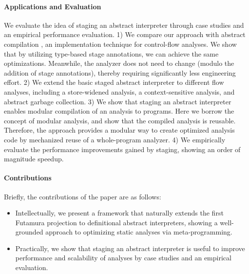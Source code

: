 \paragraph{Applications and Evaluation}
We evaluate the idea of staging an abstract interpreter through
case studies and an empirical performance evaluation.
1) We compare our approach with abstract compilation
\cite{Boucher:1996:ACN:647473.727587}, an implementation technique for
control-flow analyses. We show that by utilizing type-based stage
annotations, we can achieve the same optimizations. Meanwhile,
the analyzer does not need to change (modulo the addition of stage annotations),
thereby requiring significantly less engineering effort.
2) We extend the basic staged abstract interpreter to different flow
analyses, including a store-widened analysis, a context-sensitive
analysis, and abstract garbage collection.
3) We show that staging an abstract interpreter enables modular
compilation of an analysis to programs. Here we borrow the concept of
modular analysis, and show that the compiled analysis is reusable.
Therefore, the approach provides a modular way to create optimized
analysis code by mechanized reuse of a whole-program analyzer.
4) We empirically evaluate the performance improvements gained by staging,
showing an order of magnitude speedup.

\paragraph{Contributions} Briefly, the contributions of the paper are as follows:
\begin{itemize}[leftmargin=2em]
  \item Intellectually, we present a framework that naturally extends the first
    Futamura projection to definitional abstract interpreters, showing a
    well-grounded approach to optimizing static analyses via meta-programming.
  \item Practically, we show that staging an abstract interpreter is useful to
    improve performance and scalability of analyses by case studies and an
    empirical evaluation.
\end{itemize}

